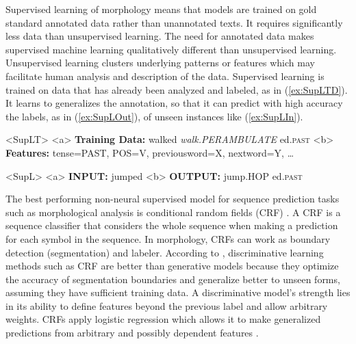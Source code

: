 \documentclass[12pt]{article}
\begin{document}
Supervised learning of morphology means that models are trained on gold standard annotated data rather than unannotated texts. It requires significantly less data than unsupervised learning. The need for annotated data makes supervised machine learning qualitatively different than unsupervised learning. Unsupervised learning clusters underlying patterns or features which may facilitate human analysis and description of the data. Supervised learning is trained on data that has already been analyzed and labeled, as in (\ref{ex:SupLTD}). It learns to generalizes the annotation, so that it can predict with high accuracy the labels, as in (\ref{ex:SupLOut}), of unseen instances like (\ref{ex:SupLIn}). 

\begin{singlespace}
\pex<SupLT>   
\label{ex:SupLT}
\a<a> \textbf{Training Data:} \hspace{2mm} walked \hspace{2mm} \hspace{5mm} \textit{walk.PERAMBULATE} \hspace{1mm} ed.\textsc{past}
\label{ex:SupLTD}
\a<b> \textbf{Features:}  tense=PAST, \hspace{1mm} POS=V, \hspace{1mm} previousword=X, \hspace{1mm} nextword=Y, \hspace{1mm} \dots 
\label{ex:SupLTFtrs}
\xe

\pex<SupL>   
\label{ex:SupLTrainIn}
\a<a> \textbf{INPUT:}  jumped 
\label{ex:SupLIn}
\a<b> \textbf{OUTPUT:} jump.HOP \hspace{1mm} ed.\textsc{past}
\label{ex:SupLOut}
\xe
\end{singlespace}

The best performing non-neural supervised model for sequence prediction tasks such as morphological analysis is conditional random fields (CRF) \cite{lafferty_conditional_2001,muller_efficient_2013,ruokolainen_comparative_2016}. A CRF is a sequence classifier that considers the whole sequence when making a prediction for each symbol in the sequence. In morphology, CRFs can work as boundary detection (segmentation) and labeler. According to , discriminative learning methods such as CRF are better than generative models because they optimize the accuracy of segmentation boundaries and generalize better to unseen forms, assuming they have sufficient training data. A discriminative model's strength lies in its ability to define features beyond the previous label and allow arbitrary weights. CRFs apply logistic regression which allows it to make generalized predictions from arbitrary and possibly dependent features \cite{ruokolainen_supervised_2013}. 
\end{document}
